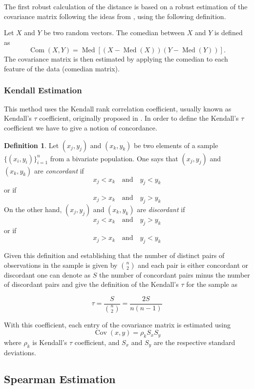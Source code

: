 \documentclass[11pt]{article}
\theoremstyle{definition}
\newtheorem{definition}{Definition}[section]
\theoremstyle{remark}
\theoremstyle{remark}
\theoremstyle{remark}
\begin{document}
The first robust calculation of the distance is based on a robust estimation of the
covariance matrix following the ideas from \parencite{falk1997mad}, using the following definition.

Let $X$ and $Y$ be two random vectors. The comedian between $X$ and $Y$ is defined as
%
\[
\operatorname{Com}(X, Y)=\operatorname{Med}[(X-\operatorname{Med}(X))(Y-\operatorname{Med}(Y))].
\]
%
The covariance matrix is then estimated by applying the comedian to each feature of the data (comedian matrix). 

\subsubsection{Kendall Estimation}

This method uses the Kendall rank correlation coefficient, usually known as Kendall's $\tau$ coefficient, originally proposed in \parencite{kendall1938new}. In order to define the Kendall's $\tau$ coefficient we have to give a notion of concordance. 

\begin{definition}
Let $(x_{j},y_{j})$ and $(x_{k},y_{k})$ be two elements of a sample $\{(x_{i},y_{i})\}_{i=1}^{n}$ from a bivariate population. One says that $(x_{j},y_{j})$ and $(x_{k},y_{k})$ are \textit{concordant} if 
\[
x_{j} < x_{k} \quad \text{and} \quad y_{j} < y_{k}
\]
or if
\[
x_{j} > x_{k} \quad \text{and} \quad y_{j} > y_{k}
\]
On the other hand, $(x_{j},y_{j})$ and $(x_{k},y_{k})$ are \textit{discordant} if
\[
x_{j} < x_{k} \quad \text{and} \quad y_{j} > y_{k}
\]
or if
\[
x_{j} > x_{k} \quad \text{and} \quad y_{j} < y_{k}
\]
\end{definition}

Given this definition and establishing that the number of distinct pairs of observations in the sample is given by $\binom{n}{2}$ and each pair is either concordant or discordant one can denote as $S$ the number of concordant pairs minus the number of discordant pairs and give the definition of the Kendall's $\tau$ for the sample as 

\[
\tau = \dfrac{S}{\binom{n}{2}} = \dfrac{2S}{n(n-1)}
\]

With this coefficient, each entry of the covariance matrix is estimated using
\[
\operatorname{Cov}(x, y)=\rho_{k} S_{x} S_{y}
\]
where $\rho_{k}$ is Kendall's $\tau$ coefficient, and $S_{x}$ and $S_{y}$ are the respective standard deviations.

\subsection{Spearman Estimation}
\end{document}
